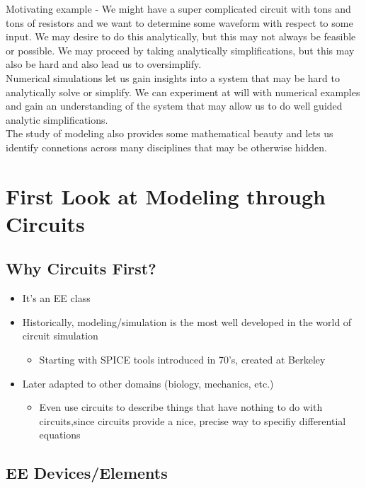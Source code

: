 \documentclass{report}
\begin{document}
Motivating example - We might have a super complicated circuit with tons and tons of resistors and we want to determine some waveform with respect to some input. We may desire to do this analytically, but this may not always be feasible or possible. We may proceed by taking analytically simplifications, but this may also be hard and also lead us to oversimplify.\\

Numerical simulations let us gain insights into a system that may be hard to analytically solve or simplify. We can experiment at will with numerical examples and gain an understanding of the system that may allow us to do well guided analytic simplifications. \\

The study of modeling also provides some mathematical beauty and lets us identify connetions across many disciplines that may be otherwise hidden.

\section{First Look at Modeling through Circuits}
\subsection{Why Circuits First?}
\begin{itemize}
    \item It's an EE class
    \item Historically, modeling/simulation is the most well developed in the world of circuit simulation
    \begin{itemize}
        \item Starting with SPICE tools introduced in 70's, created at Berkeley
    \end{itemize}
    \item Later adapted to other domains (biology, mechanics, etc.)
    \begin{itemize}
        \item Even use circuits to describe things that have nothing to do with circuits,since circuits provide a nice, precise way to specifiy differential equations
    \end{itemize}
\end{itemize}
\subsection{EE Devices/Elements}
\end{document}

